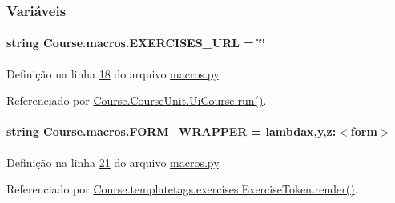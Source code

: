 \subsubsection{Variáveis}
\hypertarget{namespaceCourse_1_1macros_ac1cf8b3a78128ab6a3bac4f6be9fabbd}{}
\paragraph[{E\+X\+E\+R\+C\+I\+S\+E\+S\+\_\+\+U\+R\+L}]{\setlength{\rightskip}{0pt plus 5cm}string Course.\+macros.\+E\+X\+E\+R\+C\+I\+S\+E\+S\+\_\+\+U\+R\+L = \char`\"{}\char`\"{}}\label{namespaceCourse_1_1macros_ac1cf8b3a78128ab6a3bac4f6be9fabbd}


Definição na linha \hyperlink{macros_8py_source_l00018}{18} do arquivo \hyperlink{macros_8py_source}{macros.\+py}.



Referenciado por \hyperlink{classCourse_1_1CourseUnit_1_1UiCourse_aaaf2b8229f2b774f12e719bc0e6f13cb}{Course.\+Course\+Unit.\+Ui\+Course.\+run()}.

\hypertarget{namespaceCourse_1_1macros_a39e2016892066b4da954490ccc32533e}{}
\paragraph[{F\+O\+R\+M\+\_\+\+W\+R\+A\+P\+P\+E\+R}]{\setlength{\rightskip}{0pt plus 5cm}string Course.\+macros.\+F\+O\+R\+M\+\_\+\+W\+R\+A\+P\+P\+E\+R = lambdax,y,z\+:\textquotesingle{}$<$form$>$\textquotesingle{}}\label{namespaceCourse_1_1macros_a39e2016892066b4da954490ccc32533e}


Definição na linha \hyperlink{macros_8py_source_l00021}{21} do arquivo \hyperlink{macros_8py_source}{macros.\+py}.



Referenciado por \hyperlink{classCourse_1_1templatetags_1_1exercises_1_1ExerciseToken_af53c156486c9175af84cd003285aa95e}{Course.\+templatetags.\+exercises.\+Exercise\+Token.\+render()}.

\hypertarget{namespaceCourse_1_1macros_a9a69c2455c0c121b1c01960629575d7e}{}
